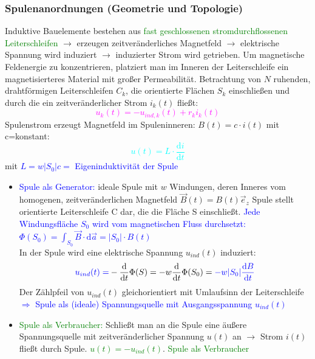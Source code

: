 \documentclass[]{article}
\newcommand{\dd}{\ensuremath{\text{d}}}
\begin{document}
\subsubsection{Spulenanordnungen (Geometrie und Topologie)}
	Induktive Bauelemente bestehen aus \textcolor{Green}{fast geschlossenen stromdurchflossenen Leiterschleifen }$\rightarrow$ erzeugen zeitveränderliches Magnetfeld $\rightarrow$ elektrische Spannung wird induziert $\rightarrow$ induzierter Strom wird getrieben. Um magnetische Feldenergie zu konzentrieren, platziert man im Inneren der Leiterschleife ein magnetisierteres Material mit großer Permeabilität. Betrachtung von $N$ ruhenden, drahtförmigen Leiterschleifen $C_k$, die orientierte Flächen $S_k$ einschließen und durch die ein zeitveränderlicher Strom $i_k(t)$ fließt: 
	\textcolor{magenta}{$$u_k(t)=-u_{ind,k}(t)+r_ki_k(t)$$}
	Spulenstrom erzeugt Magnetfeld im Spuleninneren: $B(t)=c\cdot i(t)$ mit c=konstant: 
	\textcolor{cyan}{$$u(t)=L\cdot \frac{\dd i}{\dd t}$$} mit \textcolor{Blue}{$L=w|S_0|c=$ Eigeninduktivität der Spule }
	
	\begin{itemize}
		\item 
			\textcolor{Blue}{Spule als Generator:} ideale Spule mit $w$ Windungen, deren Inneres vom homogenen, zeitveränderlichen Magnetfeld $\vec{B}(t)=B(t)\vec{e}_z$
			Spule stellt orientierte Leiterschleife C dar, die die Fläche S  einschließt.
			\textcolor{Blue}{Jede Windungsfläche $S_0$ wird vom magnetischen Fluss durchsetzt: $\Phi(S_0)=\int_{S_0}\vec{B}\cdot \dd \vec{a}= |S_0|\cdot B(t)$}
			\\ In der Spule wird eine elektrische Spannung $u_{ind}(t)$ induziert: $$\textcolor{blue}{u_{ind}(t)=}-\frac{\dd }{\dd t}\Phi(S)=-w\frac{\dd }{\dd t}\Phi(S_0)=\textcolor{blue}{-w|S_0|\frac{\dd B}{\dd t}}$$
			Der Zählpfeil von $u_{ind}(t)$ gleichorientiert mit Umlaufsinn der Leiterschleife
			\\\textcolor{blue}{$\Rightarrow$ Spule als (ideale) Spannungsquelle mit Ausgangsspannung $u_{ind}(t)$}
		\item 
			\textcolor{green}{Spule als Verbraucher: }Schließt man an die Spule eine äußere Spannungsquelle mit zeitveränderlicher Spannung $u(t)$ an $\rightarrow$ Strom $i(t)$ fließt durch Spule. \textcolor{green}{$u(t)=-u_{ind}(t)$}. \textcolor{green}{Spule als Verbraucher}
	\end{itemize}
\end{document}

